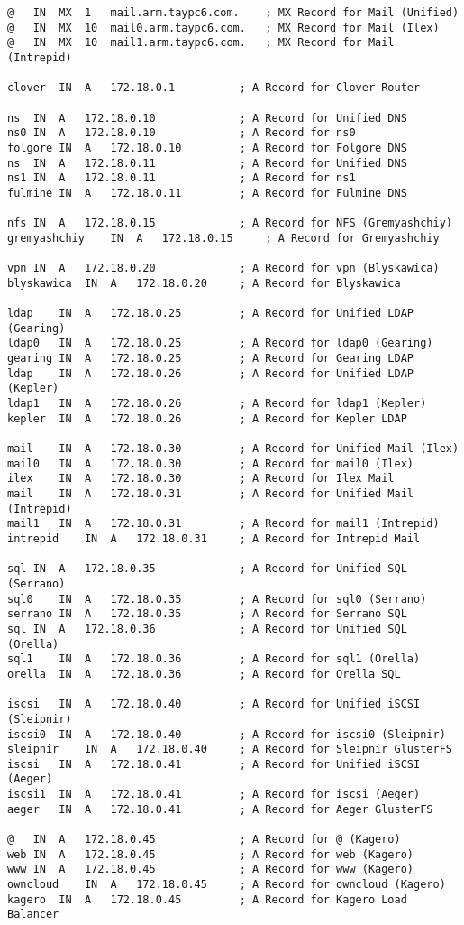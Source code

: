 \documentclass[12pt]{spieman}  %
\begin{document}
\begin{lstlisting}
@	IN	MX	1	mail.arm.taypc6.com.	; MX Record for Mail (Unified)
@	IN	MX	10	mail0.arm.taypc6.com.	; MX Record for Mail (Ilex)
@	IN	MX	10	mail1.arm.taypc6.com.	; MX Record for Mail (Intrepid)
					
clover	IN	A	172.18.0.1			; A Record for Clover Router
					
ns	IN	A	172.18.0.10				; A Record for Unified DNS
ns0	IN	A	172.18.0.10				; A Record for ns0
folgore	IN	A	172.18.0.10			; A Record for Folgore DNS
ns	IN	A	172.18.0.11				; A Record for Unified DNS
ns1	IN	A	172.18.0.11				; A Record for ns1
fulmine	IN	A	172.18.0.11			; A Record for Fulmine DNS
					
nfs	IN	A	172.18.0.15				; A Record for NFS (Gremyashchiy)
gremyashchiy	IN	A	172.18.0.15		; A Record for Gremyashchiy
					
vpn	IN	A	172.18.0.20				; A Record for vpn (Blyskawica)
blyskawica	IN	A	172.18.0.20		; A Record for Blyskawica
					
ldap	IN	A	172.18.0.25			; A Record for Unified LDAP (Gearing)
ldap0	IN	A	172.18.0.25			; A Record for ldap0 (Gearing)
gearing	IN	A	172.18.0.25			; A Record for Gearing LDAP
ldap	IN	A	172.18.0.26			; A Record for Unified LDAP (Kepler)
ldap1	IN	A	172.18.0.26			; A Record for ldap1 (Kepler)
kepler	IN	A	172.18.0.26			; A Record for Kepler LDAP
					
mail	IN	A	172.18.0.30			; A Record for Unified Mail (Ilex)
mail0	IN	A	172.18.0.30			; A Record for mail0 (Ilex)
ilex	IN	A	172.18.0.30			; A Record for Ilex Mail
mail	IN	A	172.18.0.31			; A Record for Unified Mail (Intrepid)
mail1	IN	A	172.18.0.31			; A Record for mail1 (Intrepid)
intrepid	IN	A	172.18.0.31		; A Record for Intrepid Mail
					
sql	IN	A	172.18.0.35				; A Record for Unified SQL (Serrano)
sql0	IN	A	172.18.0.35			; A Record for sql0 (Serrano)
serrano	IN	A	172.18.0.35			; A Record for Serrano SQL
sql	IN	A	172.18.0.36				; A Record for Unified SQL (Orella)
sql1	IN	A	172.18.0.36			; A Record for sql1 (Orella)
orella	IN	A	172.18.0.36			; A Record for Orella SQL
					
iscsi	IN	A	172.18.0.40			; A Record for Unified iSCSI (Sleipnir)
iscsi0	IN	A	172.18.0.40			; A Record for iscsi0 (Sleipnir)
sleipnir	IN	A	172.18.0.40		; A Record for Sleipnir GlusterFS
iscsi	IN	A	172.18.0.41			; A Record for Unified iSCSI (Aeger)
iscsi1	IN	A	172.18.0.41			; A Record for iscsi (Aeger)
aeger	IN	A	172.18.0.41			; A Record for Aeger GlusterFS
					
@	IN	A	172.18.0.45				; A Record for @ (Kagero)
web	IN	A	172.18.0.45				; A Record for web (Kagero)
www	IN	A	172.18.0.45				; A Record for www (Kagero)
owncloud	IN	A	172.18.0.45		; A Record for owncloud (Kagero)
kagero	IN	A	172.18.0.45			; A Record for Kagero Load Balancer
					

\end{lstlisting}
\end{document}
